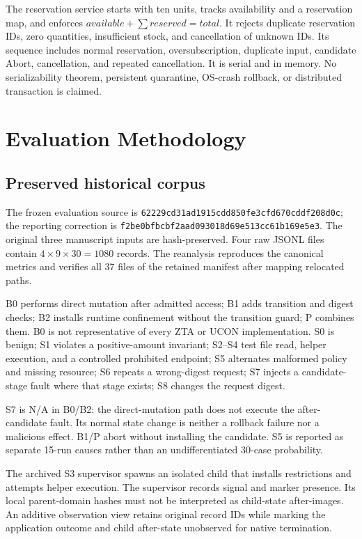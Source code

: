 \documentclass[electronics,article,submit,pdftex,moreauthors]{Definitions/mdpi}
\begin{document}
The reservation service starts with ten units, tracks availability and a reservation map, and enforces $available+\sum reserved=total$. It rejects duplicate reservation IDs, zero quantities, insufficient stock, and cancellation of unknown IDs. Its sequence includes normal reservation, oversubscription, duplicate input, candidate Abort, cancellation, and repeated cancellation. It is serial and in memory. No serializability theorem, persistent quarantine, OS-crash rollback, or distributed transaction is claimed.

\section{Evaluation Methodology}\label{sec:method}
\subsection{Preserved historical corpus}
The frozen evaluation source is \nolinkurl{62229cd31ad1915cdd850fe3cfd670cddf208d0c}; the reporting correction is \nolinkurl{f2be0bfbcbf2aad093018d69e513cc61b169e5e3}. The original three manuscript inputs are hash-preserved. Four raw JSONL files contain $4\times9\times30=1080$ records. The reanalysis reproduces the canonical metrics and verifies all 37 files of the retained manifest after mapping relocated paths.

B0 performs direct mutation after admitted access; B1 adds transition and digest checks; B2 installs runtime confinement without the transition guard; P combines them. B0 is not representative of every ZTA or UCON implementation. S0 is benign; S1 violates a positive-amount invariant; S2--S4 test file read, helper execution, and a controlled prohibited endpoint; S5 alternates malformed policy and missing resource; S6 repeats a wrong-digest request; S7 injects a candidate-stage fault where that stage exists; S8 changes the request digest.

S7 is N/A in B0/B2: the direct-mutation path does not execute the after-candidate fault. Its normal state change is neither a rollback failure nor a malicious effect. B1/P abort without installing the candidate. S5 is reported as separate 15-run causes rather than an undifferentiated 30-case probability.

The archived S3 supervisor spawns an isolated child that installs restrictions and attempts helper execution. The supervisor records signal and marker presence. Its local parent-domain hashes must not be interpreted as child-state after-images. An additive observation view retains original record IDs while marking the application outcome and child after-state unobserved for native termination.
\end{document}
